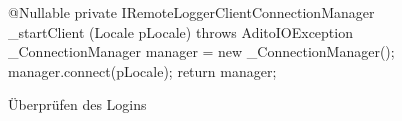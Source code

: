 \begin{wrapfigure}[7]{r}[0cm]{0.64\textwidth}
    \centering
    \vspace{-10px}
   	\begin{spacing}{0.75}
   	\begin{javacode}[firstnumber=1]
@Nullable
private IRemoteLoggerClientConnectionManager _startClient
  (Locale pLocale) throws AditoIOException
{
  _ConnectionManager manager = new _ConnectionManager();
  manager.connect(pLocale);
  return manager;
}\end{javacode}
   	\end{spacing}
   	\caption{Überprüfen des Logins}
\end{wrapfigure}